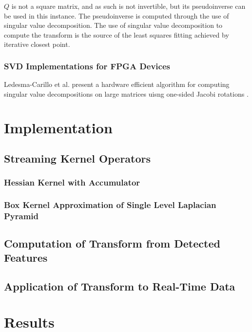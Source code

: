 \documentclass{article}
\begin{document}
$Q$ is not a square matrix, and as such is not invertible, but its pseudoinverse can be used in this instance. The pseudoinverse is computed through the use of singular value decomposition. The use of singular value decomposition to compute the transform is the source of the least squares fitting achieved by iterative closest point.

\subsubsection{SVD Implementations for FPGA Devices}

Ledesma-Carillo et al. present a hardware efficient algorithm for computing singular value decompositions on large matrices uisng one-sided Jacobi rotations \cite{ledesma-carrillo_reconfigurable_2011}.

\section{Implementation}

\subsection{Streaming Kernel Operators}

\subsubsection{Hessian Kernel with Accumulator}

\subsubsection{Box Kernel Approximation of Single Level Laplacian Pyramid}

\subsection{Computation of Transform from Detected Features}

\subsection{Application of Transform to Real-Time Data}

\section{Results}
\end{document}
